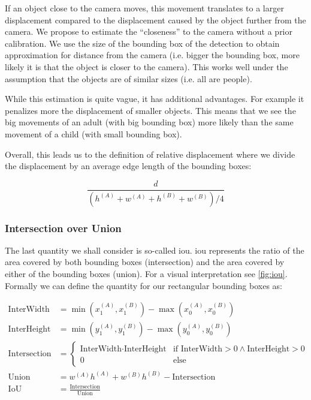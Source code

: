 If an object close to the camera moves, this movement translates to a larger displacement compared to the displacement caused by the object further from the camera. We propose to estimate the ``closeness'' to the camera without a prior calibration. We use the size of the bounding box of the detection to obtain approximation for distance from the camera (i.e. bigger the bounding box, more likely it is that the object is closer to the camera). This works well under the assumption that the objects are of similar sizes (i.e. all are people).

While this estimation is quite vague, it has additional advantages. For example it penalizes more the displacement of smaller objects. This means that we see the big movements of an adult (with big bounding box) more likely than the same movement of a child (with small bounding box).

Overall, this leads us to the definition of relative displacement where we divide the displacement by an average edge length of the bounding boxes:

$$\frac{d}{\left(h^{(A)} + w^{(A)} + h^{(B)} + w^{(B)}\right) / 4}$$

\subsubsection{Intersection over Union}

The last quantity we shall consider is so-called \gls{iou}. \Gls{iou} represents the ratio of the area covered by both bounding boxes (intersection) and the area covered by either of the bounding boxes (union). For a visual interpretation see \autoref{fig:iou}. Formally we can define the quantity for our rectangular bounding boxes as:

\begin{align*}
    \text{InterWidth} &= \min\left(x_1^{(A)}, x_1^{(B)}\right) - \max\left(x_0^{(A)}, x_0^{(B)}\right) \\
    \text{InterHeight} &= \min\left(y_1^{(A)}, y_1^{(B)}\right) - \max\left(y_0^{(A)}, y_0^{(B)}\right) \\
    \text{Intersection} &= \begin{cases}\text{InterWidth} \cdot \text{InterHeight} & \text{if InterWidth} > 0 \land \text{InterHeight} > 0 \\ 0 & \text{else}\end{cases} \\
    \text{Union} &= w^{(A)} h^{(A)} + w^{(B)} h^{(B)} - \text{Intersection} \\
    \text{IoU} &= \frac{\text{Intersection}}{\text{Union}}
\end{align*}

